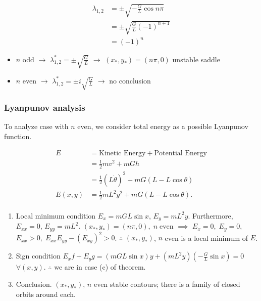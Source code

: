 \documentclass[12pt]{article}
\begin{document}
\begin{equation*}
  \begin{aligned}
    \lambda_{1,2}&=\pm\sqrt{-\frac{G}{L}\cos{n\pi}} \\
    &= \pm \sqrt{\frac{G}{L}{(-1)}^{n+1}}  \\
    &= (-1)^n
  \end{aligned}
\end{equation*}

\begin{itemize}
\item $n$ odd $\longrightarrow$ $\lambda^*_{1,2}=\pm\sqrt{\frac{G}{L}}$
  $\longrightarrow$ $(x_*,y_*)=(n\pi,0)$ unstable saddle
\item $n$ even $\longrightarrow$ $\lambda^*_{1,2}=\pm i\sqrt{\frac{G}{L}}$
  $\longrightarrow$ no conclusion
\end{itemize}

\subsubsection*{Lyanpunov analysis}
To analyze case with $n$ even, we consider total energy as a possible Lyanpunov
function.

\begin{equation*}
  \begin{aligned}
    E &= \text{Kinetic Energy} + \text{Potential Energy} \\
    &= \frac{1}{2}mv^2 + mGh \\
    &= \frac{1}{2}{(L\dot{\theta})}^2 + mG(L-L\cos\theta) \\
    E(x,y) &= \frac{1}{2}mL^2y^2 + mG(L-L\cos\theta). \\
  \end{aligned}
\end{equation*}

\begin{enumerate}
\item Local minimum condition $E_x=mGL\sin x$, $E_y=mL^2y$. Furthermore,
  $E_{xx}=0$, $E_{yy}=mL^2$. $(x_*,y_*)=(n\pi,0),\;n\;\text{even}$ $\implies$
  $E_x=0,\;E_y=0$, $E_{xx}>0,\;E_{xx}E_{yy}-{(E_{xy})}^2>0$. $\therefore$
  $(x_*,y_*)$, $n$ even is a local minimum of $E$.
\item Sign condition $E_x f + E_y g = (mGL\sin x)y + (mL^2y)(-\frac{G}{L}\sin
  x)=0$ $\forall (x,y)$. $\therefore$ we are in case (c) of theorem.
\item Conclusion. $(x_*,y_*)$, $n$ even stable contours; there is a family of
  closed orbits around each.
\end{enumerate}
\end{document}
